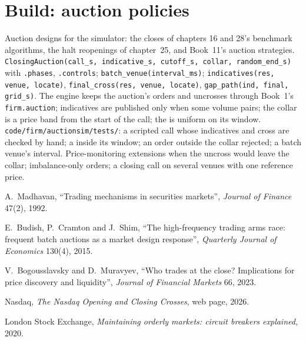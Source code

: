 \section{Build: auction policies}\label{bld:mx:auction-mechanics-and-theory:auctionsim}

\begin{build}
 Auction designs for the simulator: the closes of chapters 16 and 28's benchmark algorithms, the halt reopenings of chapter~25, and
Book~11's auction strategies.
 \texttt{ClosingAuction(call\_s, indicative\_s, cutoff\_s, collar, random\_end\_s)} with \texttt{.phases}, \texttt{.controls};
\texttt{batch\_venue(interval\_ms)}; \texttt{indicatives(res, venue, locate)}, \texttt{final\_cross(res, venue, locate)}, \texttt{gap\_path(ind, final,
grid\_s)}.
 The engine keeps the auction's orders and uncrosses through Book~1's \texttt{firm.auction}; indicatives are published only when some
volume pairs; the collar is a price band from the start of the call; the  is uniform on its window.
 \texttt{code/firm/auctionsim/tests/}: a scripted call whose indicatives and cross are checked by hand; a  inside its
window; an order outside the collar rejected; a batch venue's interval.
 Price-monitoring extensions when the uncross would leave the collar; imbalance-only orders; a closing call on several venues with one
reference price.
\end{build}

\begin{omsources}
\item A.~Madhavan, ``Trading mechanisms in securities markets'', \emph{Journal of Finance} 47(2), 1992.
\item E.~Budish, P.~Cramton and J.~Shim, ``The high-frequency trading arms race: frequent batch auctions as a market design response'', \emph{Quarterly
Journal of Economics} 130(4), 2015.
\item V.~Bogousslavsky and D.~Muravyev, ``Who trades at the close? Implications for price discovery and liquidity'', \emph{Journal of Financial Markets}
66, 2023.
\item Nasdaq, \emph{The Nasdaq Opening and Closing Crosses}, web page, 2026.
\item London Stock Exchange, \emph{Maintaining orderly markets: circuit breakers explained}, 2020.
\end{omsources}


